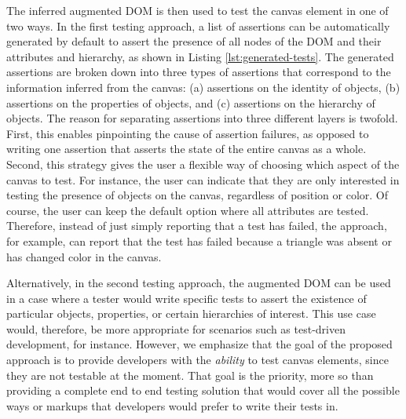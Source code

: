 The inferred augmented DOM is then used to test the canvas element in one of two ways. In the first testing approach, a list of assertions can be automatically generated by default to assert the presence of all nodes of the DOM and their attributes and hierarchy, as shown in Listing \ref{lst:generated-tests}. The generated assertions are broken down into three types of assertions that correspond to the information inferred from the canvas: (a) assertions on the identity of objects, (b) assertions on the properties of objects, and (c) assertions on the hierarchy of objects. The reason for separating assertions into three different layers is twofold. First, this enables pinpointing the cause of assertion failures, as opposed to writing one assertion that asserts the state of the entire canvas as a whole. Second, this strategy gives the user a flexible way of choosing which aspect of the canvas to test. For instance, the user can indicate that they are only interested in testing the presence of objects on the canvas, regardless of position or color. Of course, the user can keep the default option where all attributes are tested. Therefore, instead of just simply reporting that a test has failed, the approach, for example, can report that the test has failed because a triangle was absent or has changed color in the canvas.

Alternatively, in the second testing approach, the augmented DOM can be used in a case where a tester would write specific tests to assert the existence of particular objects, properties, or certain hierarchies of interest. %
This use case would, therefore, be more appropriate for scenarios such as test-driven development, for instance.
However, we emphasize that the goal of the proposed approach 
is to provide developers with the \emph{ability} to test canvas elements, since they are not testable at the moment. That goal is the priority, more so than providing a complete end to end testing 
solution that would cover all the possible ways or markups 
that developers would prefer to write their tests in. 

